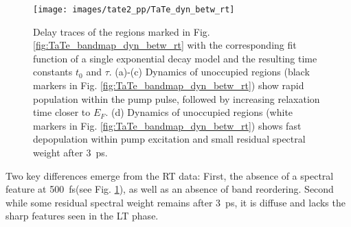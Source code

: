 \begin{figure}[b!]
	\centering
	\texttt{[image: images/tate2\_pp/TaTe\_dyn\_betw\_rt]}
	\caption{Delay traces of the regions marked in Fig. \ref{fig:TaTe_bandmap_dyn_betw_rt} with the corresponding fit function of a single exponential decay model and the resulting time constants $t_0$ and $\tau$. (a)-(c) Dynamics of unoccupied regions (black markers in Fig. \ref{fig:TaTe_bandmap_dyn_betw_rt}) show rapid population within the pump pulse, followed by increasing relaxation time closer to $E_F$. (d) Dynamics of unoccupied regions (white markers in Fig. \ref{fig:TaTe_bandmap_dyn_betw_rt}) shows fast depopulation within pump excitation and small residual spectral weight after \qty{3}{\pico\second}.}
	\label{fig:TaTe_dyn_betw_rt}
\end{figure}


Two key differences emerge from the RT data:
First, the absence of a spectral feature at \qty{500}{\femto\second}(see Fig. \ref{fig:TaTe_dyn_betw_rt}), as well as an absence of band reordering.
Second while some residual spectral weight remains after \qty{3}{\pico\second}, it is diffuse and lacks the sharp features seen in the LT phase.

